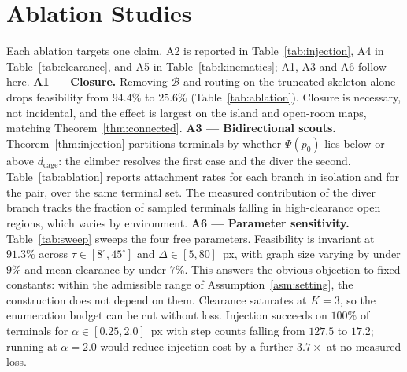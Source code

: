 \documentclass[conference]{IEEEtran}
\begin{document}
\section{Ablation Studies}
\label{sec:ablation}
Each ablation targets one claim. A2 is reported in Table~\ref{tab:injection}, A4 in Table~\ref{tab:clearance}, and A5 in Table~\ref{tab:kinematics}; A1, A3 and A6 follow here.
\textbf{A1 --- Closure.} Removing $\mathcal{B}$ and routing on the truncated skeleton alone drops feasibility from $94.4\%$ to $25.6\%$ (Table~\ref{tab:ablation}). Closure is necessary, not incidental, and the effect is largest on the island and open-room maps, matching Theorem~\ref{thm:connected}.
\textbf{A3 --- Bidirectional scouts.} Theorem~\ref{thm:injection} partitions terminals by whether $\Psi(p_0)$ lies below or above $d_{\mathrm{cage}}$: the climber resolves the first case and the diver the second. Table~\ref{tab:ablation} reports attachment rates for each branch in isolation and for the pair, over the same terminal set. The measured contribution of the diver branch tracks the fraction of sampled terminals falling in high-clearance open regions, which varies by environment.
\textbf{A6 --- Parameter sensitivity.} Table~\ref{tab:sweep} sweeps the four free parameters. Feasibility is invariant at $91.3\%$ across $\tau\in[8^\circ,45^\circ]$ and $\Delta\in[5,80]$~px, with graph size varying by under $9\%$ and mean clearance by under $7\%$. This answers the obvious objection to fixed constants: within the admissible range of Assumption~\ref{asm:setting}, the construction does not depend on them. Clearance saturates at $K=3$, so the enumeration budget can be cut without loss. Injection succeeds on $100\%$ of terminals for $\alpha\in[0.25,2.0]$~px with step counts falling from $127.5$ to $17.2$; running at $\alpha=2.0$ would reduce injection cost by a further $3.7\times$ at no measured loss.
\end{document}
